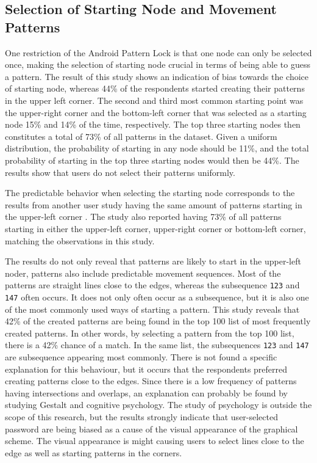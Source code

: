     \subsection{Selection of Starting Node and Movement Patterns}
      One restriction of the Android Pattern Lock is that one node can only be selected once, making the selection of starting node crucial in terms of being able to guess a pattern. The result of this study shows an indication of bias towards the choice of starting node, whereas 44\% of the respondents started creating their patterns in the upper left corner. The second and third most common starting point was the upper-right corner and the bottom-left corner that was selected as a starting node 15\% and 14\% of the time, respectively. The top three starting nodes then constitutes a total of 73\% of all patterns in the dataset. Given a uniform distribution, the probability of starting in any node should be 11\%, and the total probability of starting in the top three starting nodes would then be 44\%. The results show that users do not select their patterns uniformly.

      The predictable behavior when selecting the starting node corresponds to the results from another user study having the same amount of patterns starting in the upper-left corner \cite{Uellenbeck}. The study also reported having 73\% of all patterns starting in either the upper-left corner, upper-right corner or bottom-left corner, matching the observations in this study.

      The results do not only reveal that patterns are likely to start in the upper-left noder, patterns also include predictable movement sequences. Most of the patterns are straight lines close to the edges, whereas the subsequence \texttt{123} and \texttt{147} often occurs. It does not only often occur as a subsequence, but it is also one of the most commonly used ways of starting a pattern. This study reveals that 42\% of the created patterns are being found in the top 100 list of most frequently created patterns. In other words, by selecting a pattern from the top 100 list, there is a 42\% chance of a match. In the same list, the subsequences \texttt{123} and \texttt{147} are subsequence appearing most commonly. There is not found a specific explanation for this behaviour, but it occurs that the respondents preferred creating patterns close to the edges. Since there is a low frequency of patterns having intersections and overlaps, an explanation can probably be found by studying Gestalt and cognitive psychology. The study of psychology is outside the scope of this research, but the results strongly indicate that user-selected password are being biased as a cause of the visual appearance of the graphical scheme. The visual appearance is might causing users to select lines close to the edge as well as starting patterns in the corners.

